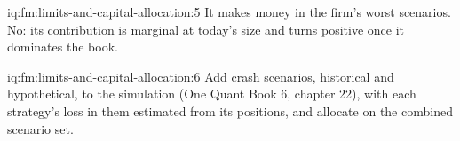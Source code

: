\begin{solution}{iq:fm:limits-and-capital-allocation:5}
It makes money in the firm's worst scenarios. No: its contribution is marginal at today's size and turns positive once it dominates the book.
\end{solution}

\begin{solution}{iq:fm:limits-and-capital-allocation:6}
Add crash scenarios, historical and hypothetical, to the simulation (One Quant Book 6, chapter 22), with each strategy's loss in them estimated from
its positions, and allocate on the combined scenario set.
\end{solution}
